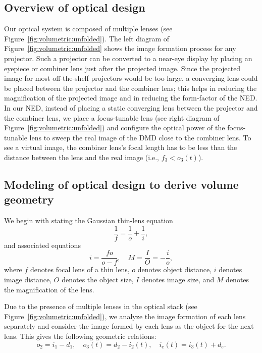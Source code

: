 

\subsection{Overview of optical design} 
Our optical system is composed of multiple lenses (see Figure~\ref{fig:volumetric:unfolded}). The left diagram of Figure~\ref{fig:volumetric:unfolded} shows the image formation process for any projector. Such a projector can be converted to a near-eye display by placing an eyepiece or combiner lens just after the projected image. Since the projected image for most off-the-shelf projectors would be too large, a converging lens could be placed between the projector and the combiner lens; this helps in reducing the magnification of the projected image and in reducing the form-factor of the NED. In our NED, instead of placing a static converging lens between the projector and the combiner lens, we place a focus-tunable lens (see right diagram of Figure~\ref{fig:volumetric:unfolded}) and configure the optical power of the focus-tunable lens to sweep the real image of the DMD close to the combiner lens. To see a virtual image, the combiner lens's focal length has to be less than the distance between the lens and the real image (i.e., $f_3 < o_3(t)$).

\subsection{Modeling of optical design to derive volume geometry}
We begin with stating the Gaussian thin-lens equation
\begin{equation}
\frac{1}{f} = \frac{1}{o} + \frac{1}{i},
\label{eq:basic_optics_equation}
\end{equation}
and associated equations
\begin{equation}
i = \frac{f o}{o - f},\quad M = \frac{I}{O} = -\frac{i}{o},
\label{eq:basic_optics_equation_2}
\end{equation}
where $f$ denotes focal lens of a thin lens, $o$ denotes object distance, $i$ denotes image distance, $O$ denotes the object size, $I$ denotes image size, and $M$ denotes the magnification of the lens.




Due to the presence of multiple lenses in the optical stack (see Figure~\ref{fig:volumetric:unfolded}), we analyze the image formation of each lens separately and consider the image formed by each lens as the object for the next lens. This gives the following geometric relations:
\begin{equation}
o_2 = i_1-d_1, \quad o_3(t) = d_2 - i_2(t), \quad i_e(t) = i_3(t) + d_e.
\label{eq:geometric_relations}
\end{equation}

